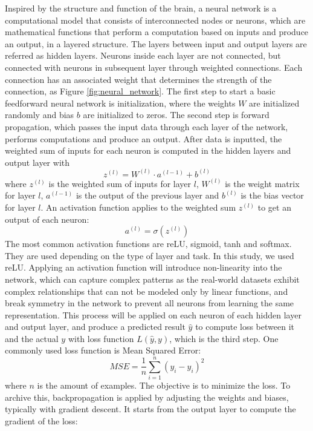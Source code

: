 \documentclass[12pt,a4paper,english
]{tunithesis}
\begin{document}
Inspired by the structure and function of the brain, a neural network is a computational model that consists of  interconnected nodes or neurons, which are mathematical functions that perform a computation based on inputs and produce an output, in a layered structure. The layers between input and output layers are referred as hidden layers. Neurons inside each layer are not connected, but connected with neurons in subsequent layer through weighted connections. Each connection has an associated weight that determines the strength of the connection, as Figure \ref{fig:neural_network}. The first step to start a basic feedforward neural network is initialization, where the weights $W$ are initialized randomly and bias $b$ are initialized to zeros. The second step is forward propagation, which passes the input data through each layer of the network, performs computations and produce an output. After data is inputted, the weighted sum of inputs for each neuron is computed in the hidden layers and output layer with
\begin{equation}
    z^{(l)}=W^{(l)} \cdot a^{(l-1)}+b^{(l)}
\end{equation}
where $z^{(l)}$ is the weighted sum of inputs for layer $l$, $W^{(l)}$ is the weight matrix for layer $l$, $a^{(l-1)}$ is the output of the previous layer and $b^{(l)}$ is the bias vector for layer $l$. An activation function applies to the weighted sum $z^{(l)}$ to get an output of each neuron:
\begin{equation}
    a^{(l)}=\sigma\left(z^{(l)}\right)
\end{equation}
The most common activation functions are reLU, sigmoid, tanh and softmax. They are used depending on the type of layer and task. In this study, we used reLU. Applying an activation function will introduce non-linearity into the network, which can capture complex patterns as the real-world datasets exhibit complex relationships that can not be modeled only by linear functions, and break symmetry in the network to prevent all neurons from learning the same representation. This process will be applied on each neuron of each hidden layer and output layer, and produce a predicted result $\hat{y}$ to compute loss between it and the actual $y$ with loss function $L(\hat{y}, y)$, which is the third step. One commonly used loss function is Mean Squared Error:
\begin{equation}
\label{eq:mse}
    M S E=\frac{1}{n} \sum_{i=1}^n\left(y_i-\hat{y}_i\right)^2
\end{equation}
where $n$ is the amount of examples. The objective is to minimize the loss. To archive this, backpropagation is applied by adjusting the weights and biases, typically with gradient descent. It starts from the output layer to compute the gradient of the loss:
\end{document}
